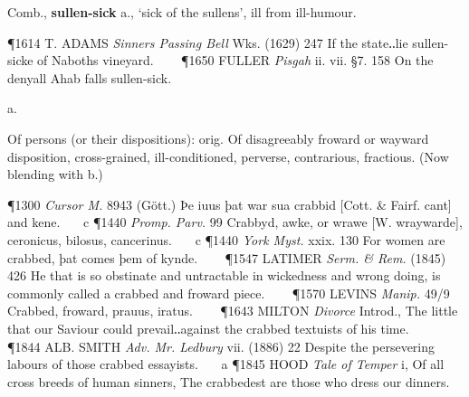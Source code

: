 \begin{description}[wide, labelwidth=!, labelindent=0pt]
\begin{myenumerate}
 Comb., \textbf{sullen-sick} a., ‘sick of the sullens’, ill from ill-humour.

\P 1614 T. ADAMS  \textit{Sinners Passing Bell} Wks. (1629) 247 If the state‥lie sullen-sicke of Naboths vineyard.    
\P 1650 FULLER  \textit{Pisgah} ii. vii. §7. 158 On the denyall Ahab falls sullen-sick.
\end{myenumerate}


 a.

\noindent {}

\vspace{-0.3cm}

\begin{myenumerate}

 Of persons (or their dispositions): orig. Of disagreeably froward or wayward disposition, cross-grained, ill-conditioned, perverse, contrarious, fractious. (Now blending with b.)

\P 1300  \textit{Cursor M.} 8943 (Gött.) Þe iuus þat war sua crabbid [Cott. \& Fairf. cant] and kene.    c 
\P 1440  \textit{Promp. Parv.} 99 Crabbyd, awke, or wrawe [W. wraywarde], ceronicus, bilosus, cancerinus.    c 
\P 1440  \textit{York Myst.} xxix. 130 For women are crabbed, þat comes þem of kynde.    
\P 1547 LATIMER  \textit{Serm. \& Rem.} (1845) 426 He that is so obstinate and untractable in wickedness and wrong doing, is commonly called a crabbed and froward piece.    
\P 1570 LEVINS  \textit{Manip.} 49/9 Crabbed, froward, prauus, iratus.    
\P 1643 MILTON  \textit{Divorce} Introd., The little that our Saviour could prevail‥against the crabbed textuists of his time.    
\P 1844 ALB.  SMITH \textit{Adv. Mr. Ledbury} vii. (1886) 22 Despite the persevering labours of those crabbed essayists.    a 
\P 1845 HOOD  \textit{Tale of Temper} i, Of all cross breeds of human sinners, The crabbedest are those who dress our dinners.


\end{myenumerate}
\end{description}
